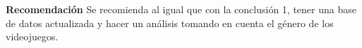 \documentclass[oneside,11pt]{Latex/Classes/PhDthesisPSnPDF}
\begin{document}
\textbf{Recomendación} Se recomienda al igual que con la conclusión 1,
tener una base de datos actualizada y hacer un análisis tomando en
cuenta el género de los videojuegos.

\appendix
\renewcommand{\thechapter}{\Alph{chapter}}

\renewcommand{\bibname}{Lista de Referencias}
 
 

\end{document}
